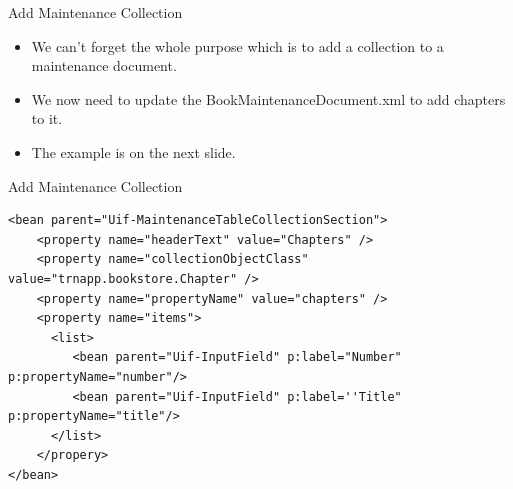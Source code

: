 \documentclass[xcolor=dvipsnames,14pt,professionalfonts]{beamer}
\begin{document}
    \begin{frame}{Add Maintenance Collection}
     \begin{itemize}
       \item We can't forget the whole purpose which is to add a
         collection to a maintenance document. 
       \item We now need to update the BookMaintenanceDocument.xml to
         add chapters to it.
       \item The example is on the next slide.
      \end{itemize}     
    \end{frame}

 \begin{frame}[fragile]{Add Maintenance Collection}
 \begin{verbatim}
<bean parent="Uif-MaintenanceTableCollectionSection">
    <property name="headerText" value="Chapters" />
    <property name="collectionObjectClass" value="trnapp.bookstore.Chapter" />
    <property name="propertyName" value="chapters" />           
    <property name="items">
      <list>
         <bean parent="Uif-InputField" p:label="Number" p:propertyName="number"/>
         <bean parent="Uif-InputField" p:label=''Title" p:propertyName="title"/>
      </list>
    </propery>
</bean>      
    \end{verbatim}
\end{frame}
           
\end{document}
